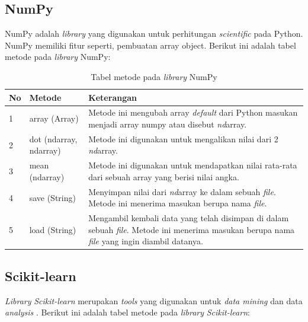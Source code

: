 \subsection{NumPy}
NumPy adalah \textit{library} yang digunakan untuk perhitungan 
\textit{scientific} pada Python. NumPy memiliki fitur seperti, 
pembuatan array\textit{ }object. Berikut ini adalah tabel metode pada 
\textit{library }NumPy:
\begin{table}[H]
	\caption{Tabel metode pada \textit{library} NumPy}
	\centering
	\small
	\begin{adjustbox}{width=1\textwidth}
	\begin{tabular}{|p{0.5cm}|p{6cm}|p{6cm}|}
		\hline
		\textbf{No} & \textbf{Metode} & \textbf{Keterangan} \\
		\hline
		1 & array (Array) & Metode ini mengubah array \textit{default }dari 
		Python masukan menjadi array numpy atau disebut \textit{nd}array. \\
		\hline
		2 & dot (ndarray, ndarray) & Metode ini digunakan untuk mengalikan nilai 
		dari 2 \textit{nd}array. \\
		\hline
		3 & mean (ndarray) & Metode ini digunakan untuk mendapatkan nilai 
		rata-rata dari sebuah array yang berisi nilai angka. \\
		\hline
		4 & save (String) & Menyimpan nilai dari \textit{nd}array\textit{ }
		ke dalam sebuah \textit{file}. Metode ini menerima masukan berupa 
		nama \textit{file}. \\
		\hline
		5 & load (String) & Mengambil kembali data yang telah disimpan di dalam 
		sebuah \textit{file}. Metode ini menerima masukan berupa nama 
		\textit{file} yang ingin diambil datanya. \\
		\hline
	\end{tabular}
	\end{adjustbox}
\end{table}
\subsection{Scikit-learn}
\textit{Library} \textit{Scikit-learn} merupakan \textit{tools} 
yang digunakan untuk \textit{data mining} dan data \textit{analysis}
. Berikut ini adalah tabel metode pada \textit{library} \textit{
	Scikit-learn}:

